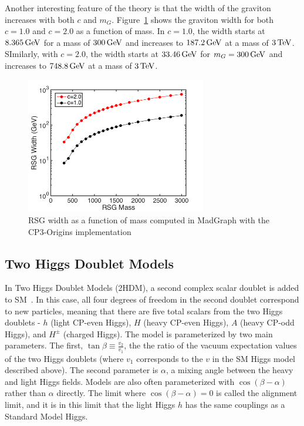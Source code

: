 Another interesting feature of the theory is that the width of the graviton increases with both $c$ and $m_G$. Figure~\ref{fig:G_width} shows the graviton width for both $c=1.0$ and $c=2.0$ as a function of mass. In $c=1.0$, the width starts at $8.365 \GeV$ for a mass of $300 \GeV$ and increases to $187.2 \GeV$ at a mass of $3 \TeV$. SImilarly, with $c=2.0$, the width starts at $33.46 \GeV$ for $m_G = 300 \GeV$ and increases to $748.8 \GeV$ at a mass of $3 \TeV$. 

\begin{figure}[h!]
  \centering
  \captionsetup{justification=centering}

  \includegraphics[width=0.7\textwidth]{figures/RSG_width}
   \caption{RSG width as a function of mass computed in MadGraph with the CP3-Origins implementation~\cite{RSG_LHC,MadGraph}}
  \label{fig:G_width}
\end{figure}

\subsection{Two Higgs Doublet Models}

In Two Higgs Doublet Models (2HDM), a second complex scalar doublet is added to SM~\cite{HH_2HDM,2HDM2,2HDM3}. In this case, all four degrees of freedom in the second doublet correspond to new particles, meaning that there are five total scalars from the two Higgs doublets - $h$ (light CP-even Higgs), $H$ (heavy CP-even Higgs), $A$ (heavy CP-odd Higgs), and $H^{\pm}$ (charged Higgs). The model is parameterized by two main parameters. The first, $\tan{\beta} \equiv \frac{v_2}{v_1}$, the the ratio of the vacuum expectation values of the two Higgs doublets (where $v_1$ corresponds to the $v$ in the SM Higgs model described above). The second parameter is $\alpha$, a mixing angle between the heavy and light Higgs fields. Models are also often parameterized with $\cos(\beta - \alpha)$ rather than $\alpha$ directly. The limit where $\cos(\beta - \alpha) = 0$ is called the alignment limit, and it is in this limit that the light Higgs $h$ has the same couplings as a Standard Model Higgs. 

